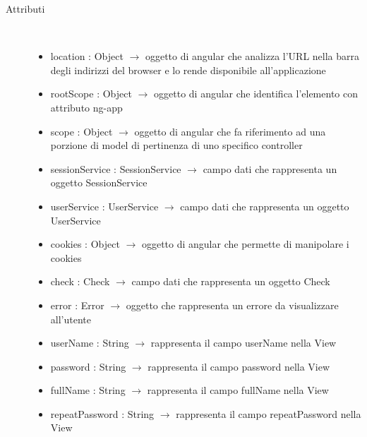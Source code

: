 \begin{description}
\item[Attributi] \hfill \\
\vspace{-7mm}
\begin{itemize}
	\item location : Object $\rightarrow$ oggetto di angular che analizza l'URL nella barra degli indirizzi del browser e lo rende disponibile all'applicazione
	\item rootScope : Object $\rightarrow$ oggetto di angular che identifica l’elemento con attributo ng-app
	\item scope : Object $\rightarrow$ oggetto di angular che fa riferimento ad una porzione di model di pertinenza di uno specifico controller
	\item sessionService : SessionService $\rightarrow$ campo dati che rappresenta un oggetto SessionService
	\item userService : UserService $\rightarrow$ campo dati che rappresenta un oggetto UserService
	\item cookies : Object $\rightarrow$ oggetto di angular che permette di manipolare i cookies
	\item check : Check $\rightarrow$ campo dati che rappresenta un oggetto Check
	\item error	 : Error	 $\rightarrow$ oggetto che rappresenta un errore da visualizzare all'utente
	\item userName : String $\rightarrow$ rappresenta il campo userName nella View
	\item password : String $\rightarrow$ rappresenta il campo password nella View
	\item fullName : String $\rightarrow$ rappresenta il campo fullName nella View
	\item repeatPassword : String $\rightarrow$ rappresenta il campo repeatPassword nella View
\end{itemize}


\end{description}
